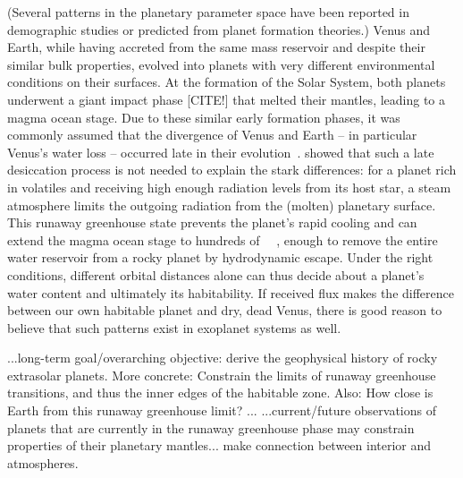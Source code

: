 \documentclass[modern]{aastex631}
\begin{document}
\begin{note}
(Several patterns in the planetary parameter space have been reported in demographic studies or predicted from planet formation theories.)
    Venus and Earth, while having accreted from the same mass reservoir and despite their similar bulk properties, evolved into planets with very different environmental conditions on their surfaces.
    At the formation of the Solar System, both planets underwent a giant impact phase [CITE!] that melted their mantles, leading to a magma ocean stage.
    Due to these similar early formation phases, it was commonly assumed that the divergence of Venus and Earth -- in particular Venus's water loss -- occurred late in their evolution~\citep{Elkins-Tanton2013}.
    \citet{Hamano2013} showed that such a late desiccation process is not needed to explain the stark differences: for a planet rich in volatiles and receiving high enough radiation levels from its host star, a steam atmosphere limits the outgoing radiation from the (molten) planetary surface.
    This runaway greenhouse state prevents the planet's rapid cooling and can extend the magma ocean stage to hundreds of \SI{}{\mega\year}, enough to remove the entire water reservoir from a rocky planet by hydrodynamic escape.
    Under the right conditions, different orbital distances alone can thus decide about a planet's water content and ultimately its habitability.
    If received flux makes the difference between our own habitable planet and dry, dead Venus, there is good reason to believe that such patterns exist in exoplanet systems as well.

    ...long-term goal/overarching objective: derive the geophysical history of rocky extrasolar planets. More concrete: Constrain the limits of runaway greenhouse transitions, and thus the inner edges of the habitable zone. Also: How close is Earth from this runaway greenhouse limit?
   ...
    ...current/future observations of planets that are currently in the runaway greenhouse phase may constrain properties of their planetary mantles... make connection between interior and atmospheres.
\end{note}
\end{document}
